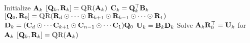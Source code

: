 
\begin{algorithmic}[1]
        \State Initialize $\mathbf{A}_k$
        \State $[\mat{Q}_k,\mat{R}_k] = \Call{QR}{\mat{A}_k}$ 
        \State $\mathbf{C}_k = \mathbf{Q}_k^\top\mathbf{B}_k$  \label{l:EXP-K-Apply} 
      \EndFor
          \State $[\mat{Q}_0,\mat{R}_0] = \Call{QR}{\mat{R}_d \odot \cdots \odot \mat{R}_{k+1} \odot \mat{R}_{k-1} \odot \cdots \odot \mat{R}_1}$ 
          \State $\mathbf{D}_k = (\mathbf{C}_d \odot \cdots \mathbf{C}_{k+1} \odot \mathbf{C}_{n-1} \odot \cdots \mathbf{C}_1)\mathbf{Q}_0$ 
          \State $\mathbf{U}_k = \mathbf{B}_k\mathbf{D}_k$  \label{l:EXP-mttkrp}
          \State Solve $\mathbf{A}_k\mathbf{R}_0^\top = \mathbf{U}_k$ for $\mathbf{A}_k$ 
          \State $[\mat{Q}_k,\mat{R}_k] = \Call{QR}{\mat{A}_k}$      
        \EndFor
      \EndWhile
    \EndFunction
  \end{algorithmic}